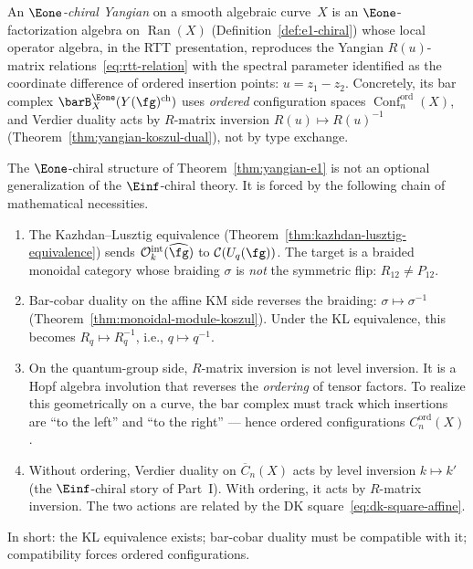 \begin{definition}
\label{def:e1-chiral-yangian}
An \emph{$\Eone$-chiral Yangian} on a smooth algebraic curve~$X$
is an $\Eone$-factorization algebra on $\operatorname{Ran}(X)$
(Definition~\ref{def:e1-chiral}) whose local operator algebra, in
the RTT presentation, reproduces the Yangian $R(u)$-matrix
relations~\eqref{eq:rtt-relation} with the spectral parameter
identified as the coordinate difference of ordered insertion points:
$u = z_1 - z_2$.  Concretely, its bar complex
$\barB^{\Eone}_X(Y(\fg)^{\mathrm{ch}})$ uses \emph{ordered}
configuration spaces $\operatorname{Conf}^{\mathrm{ord}}_n(X)$,
and Verdier duality acts by $R$-matrix inversion
$R(u) \mapsto R(u)^{-1}$
(Theorem~\ref{thm:yangian-koszul-dual}), not by type exchange.
\end{definition}

\begin{remark}
\label{rem:ordered-forced}
The $\Eone$-chiral structure of Theorem~\ref{thm:yangian-e1} is
not an optional generalization of the $\Einf$-chiral theory.  It is
forced by the following chain of mathematical necessities.
\begin{enumerate}[label=\textup{(\arabic*)}]
\item The Kazhdan--Lusztig equivalence
  (Theorem~\ref{thm:kazhdan-lusztig-equivalence}) sends
  $\mathcal{O}_k^{\mathrm{int}}(\widehat{\fg})$ to
  $\mathcal{C}(U_q(\fg))$.  The target is a braided monoidal
  category whose braiding $\sigma$ is \emph{not} the symmetric
  flip: $R_{12} \neq P_{12}$.
\item Bar-cobar duality on the affine KM side reverses the braiding:
  $\sigma \mapsto \sigma^{-1}$
  (Theorem~\ref{thm:monoidal-module-koszul}).  Under the KL
  equivalence, this becomes $R_q \mapsto R_q^{-1}$, i.e.,
  $q \mapsto q^{-1}$.
\item On the quantum-group side, $R$-matrix inversion is not
  level inversion.  It is a Hopf algebra involution that
  reverses the \emph{ordering} of tensor factors.  To realize
  this geometrically on a curve, the bar complex must track
  which insertions are ``to the left'' and ``to the right'' ---
  hence ordered configurations $C_n^{\mathrm{ord}}(X)$.
\item Without ordering, Verdier duality on
  $\overline{C}_n(X)$ acts by level inversion $k \mapsto k'$
  (the $\Einf$-chiral story of Part~I).  With ordering, it
  acts by $R$-matrix inversion.  The two actions are related
  by the DK square~\eqref{eq:dk-square-affine}.
\end{enumerate}
In short: the KL equivalence exists; bar-cobar duality must be
compatible with it; compatibility forces ordered configurations.
\end{remark}

